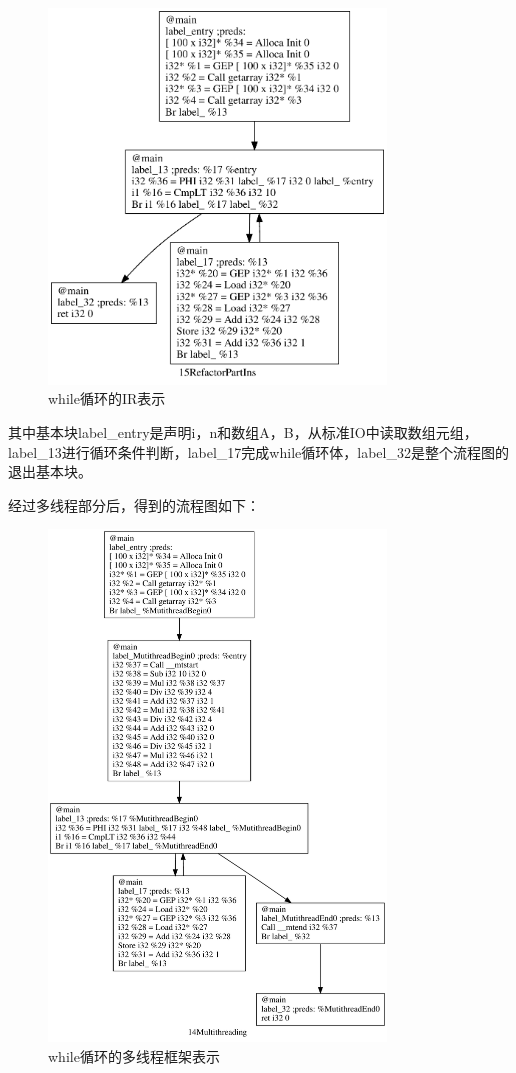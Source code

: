 \begin{figure}[htb]
  \centering
  \includegraphics[width=0.8\textwidth]{figures/mt0.pdf}
  \caption{while循环的IR表示}
  \label{fig:mt0}
\end{figure}

其中基本块label\_entry是声明i，n和数组A，B，从标准IO中读取数组元组，label\_13进行循环条件判断，label\_17完成while循环体，label\_32是整个流程图的退出基本块。

经过多线程部分后，得到的流程图如下：

\begin{figure}[htb]
  \centering
  \includegraphics[width=0.8\textwidth]{figures/mt1.pdf}
  \caption{while循环的多线程框架表示}
  \label{fig:mt1}
\end{figure}

